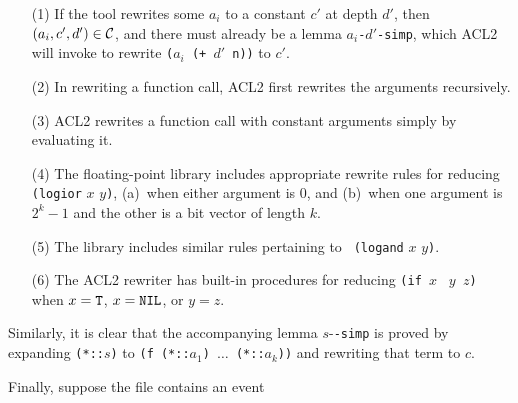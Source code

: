 \documentclass{article}
\begin{document}
\begin{enumerate}

\item[(1)] If the tool rewrites some $a_i$ to a constant $c'$ at depth
$d'$, then $(a_i,c',d') \in {\cal C}$, and there must already be a
lemma $a_i$\verb!-!$d'$\verb!-simp!, which ACL2 will invoke to
rewrite {\tt ($a_i$ (+ $d'$ n))} to $c'$.

\item[(2)] In rewriting a function call, ACL2 first rewrites the arguments
recursively.

\item[(3)] ACL2 rewrites a function call with constant arguments simply by
evaluating it.

\item[(4)] The floating-point library includes appropriate rewrite
rules for reducing {\tt (logior} $x$ $y${\tt )}, (a)~when either
argument is 0, and (b)~when one argument is $2^k-1$ and the other is a
bit vector of length $k$.

\item[(5)] The library includes similar rules pertaining to {\tt
(logand} $x$ $y${\tt )}.

\item[(6)] The ACL2 rewriter has built-in procedures for reducing \verb!(if !$x$
\verb! !$y$\verb! !$z$\verb!)! when $x = {\tt T}$, $x = {\tt NIL}$, or
$y = z$.
\end{enumerate}
Similarly, it is clear that the accompanying lemma $s$-{\tt *-simp} is
proved by expanding \verb!(*::!$s$\verb!)!  to {\tt (f (*::$a_1$)
$\ldots$ (*::$a_k$))} and rewriting that term to $c$.

Finally, suppose the file contains an event\medskip
\end{document}
